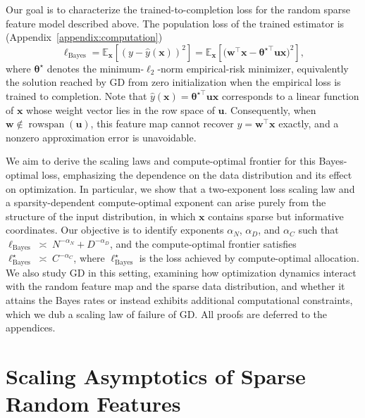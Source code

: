 \documentclass[11pt]{article}
\theoremstyle{plain}
\theoremstyle{definition}
\theoremstyle{remark}
\newcommand{\JSCheck}[1]{#1}
\begin{document}
Our goal is to characterize the trained-to-completion loss for the random sparse feature model described above. The population loss of the trained estimator is (Appendix~\ref{appendix:computation})
\begin{equation}
\ell_{\mathrm{Bayes}} = \mathbb{E}_{\mathbf{x}}\left[(y - \hat{y}(\mathbf{x}))^2\right] = \mathbb{E}_{\mathbf{x}}\!\left[ \big( \mathbf{w}^\top \mathbf{x}
- \boldsymbol{\theta}^{\star\!\top}\mathbf{u}\mathbf{x} \big)^2 \right],
\label{eq:bayes-loss}
\end{equation}
\JSCheck{where \(\boldsymbol{\theta}^\star\) denotes the minimum-\(\ell_2\)-norm empirical-risk minimizer, equivalently the solution reached by GD from zero initialization when the empirical loss is trained to completion. Note that
\(\hat{y}(\mathbf{x}) = \boldsymbol{\theta}^{\star\top}\mathbf{u}\mathbf{x}\) corresponds to a linear function of
\(\mathbf{x}\) whose weight vector lies in the row space of \(\mathbf{u}\). Consequently, when
\(\mathbf{w} \notin \operatorname{rowspan}(\mathbf{u})\), this feature map cannot recover
\(y = \mathbf{w}^\top \mathbf{x}\) exactly, and a nonzero approximation error is unavoidable.}



\JSCheck{We aim to derive the scaling laws and compute-optimal frontier for this Bayes-optimal loss, emphasizing the dependence on the data distribution and its effect on optimization. In particular, we show that a two-exponent loss scaling law and a sparsity-dependent compute-optimal exponent can arise purely from the structure of the input distribution, in which \(\mathbf{x}\) contains sparse but informative coordinates. Our objective is to identify exponents \(\alpha_N\), \(\alpha_D\), and \(\alpha_C\) such that $\ell_{\mathrm{Bayes}} \;\asymp\; N^{-\alpha_N} + D^{-\alpha_D}$, and the compute-optimal frontier satisfies $\ell_{\mathrm{Bayes}}^\star \;\asymp\; C^{-\alpha_C}$,
where \(\ell_{\mathrm{Bayes}}^\star\) is the loss achieved by compute-optimal allocation. We also study GD in this setting, examining how optimization dynamics interact with the random feature map and the sparse data distribution, and whether it attains the Bayes rates or instead exhibits additional computational constraints, which we dub a scaling law of failure of GD.  All proofs are deferred to the appendices.
}





\section{\JSCheck{Scaling Asymptotics of Sparse Random Features}}\label{Sec:scaling1}
\end{document}
